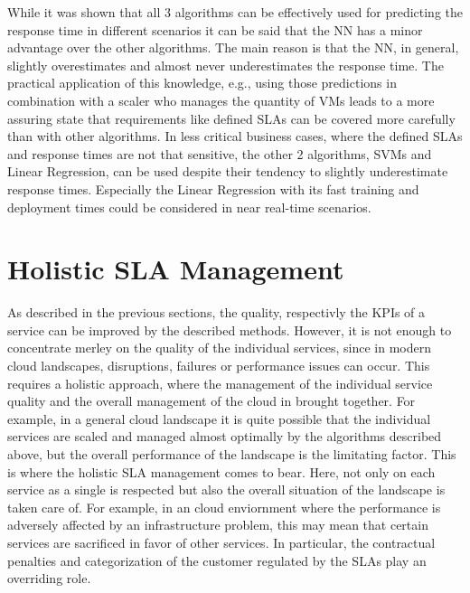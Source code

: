 While it was shown that all 3 algorithms can be effectively used for predicting the response time in different scenarios it can be said that the NN has a minor advantage over the other algorithms. The main reason is that the NN, in general, slightly overestimates and almost never underestimates the response time. The practical application of this knowledge, e.g., using those predictions in combination with a scaler who manages the quantity of VMs leads to a more assuring state that requirements like defined SLAs can be covered more carefully than with other algorithms. In less critical business cases, where the defined SLAs and response times are not that sensitive, the other 2 algorithms, SVMs and Linear Regression, can be used despite their tendency to slightly underestimate response times. Especially the Linear Regression with its fast training and deployment times could be considered in near real-time scenarios.



\section{Holistic SLA Management}
As  described in the previous sections, the quality, respectivly the KPIs of a service can be improved by the described methods. However, it is not enough to concentrate merley on the quality of the individual services, since in modern cloud landscapes, disruptions, failures or performance issues can occur. This requires a holistic approach, where the management of the individual service quality and the overall management of the cloud in brought together. For example, in a general cloud landscape it is quite possible that the individual services are scaled and managed almost optimally by the algorithms described above, but the overall performance of the landscape is the limitating factor. This is where the holistic SLA management comes to bear. Here, not only on each service as a single is respected but also the overall situation of the landscape is taken care of. For example, in an cloud enviornment where the performance is adversely affected by an infrastructure problem, this may mean that certain services are sacrificed in favor of other services. In particular, the contractual penalties and categorization of the customer regulated by the SLAs play an overriding role.


